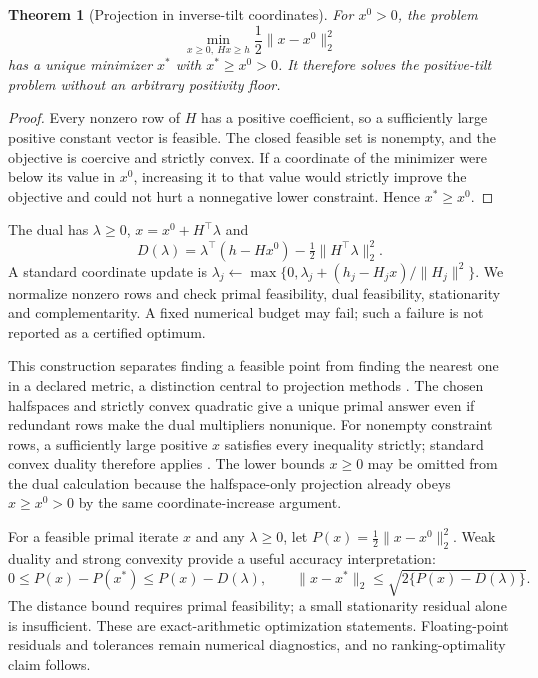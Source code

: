 \documentclass[pdflatex,sn-vancouver-num]{sn-jnl}
\theoremstyle{thmstyleone}
\newtheorem{theorem}{Theorem}
\begin{document}
\begin{theorem}[Projection in inverse-tilt coordinates]\label{thm:projection}
For $x^0>0$, the problem
\begin{equation}\label{eq:projection}
\min_{x\ge0,\ Hx\ge h}\frac12\|x-x^0\|_2^2
\end{equation}
has a unique minimizer $x^*$ with $x^*\ge x^0>0$. It therefore solves the positive-tilt problem without an arbitrary positivity floor.
\end{theorem}
\begin{proof}
Every nonzero row of $H$ has a positive coefficient, so a sufficiently large positive constant vector is feasible. The closed feasible set is nonempty, and the objective is coercive and strictly convex. If a coordinate of the minimizer were below its value in $x^0$, increasing it to that value would strictly improve the objective and could not hurt a nonnegative lower constraint. Hence $x^*\ge x^0$.
\end{proof}

The dual has $\lambda\ge0$, $x=x^0+H^\top\lambda$ and
\[
D(\lambda)=\lambda^\top(h-Hx^0)
-\tfrac12\|H^\top\lambda\|_2^2.
\]
A standard coordinate update is
$\lambda_j\leftarrow\max\{0,\lambda_j+(h_j-H_jx)/\|H_j\|^2\}$.
We normalize nonzero rows and check primal feasibility, dual feasibility, stationarity and complementarity. A fixed numerical budget may fail; such a failure is not reported as a certified optimum.

This construction separates finding a feasible point from finding the nearest one in a declared metric, a distinction central to projection methods \cite{projection,dykstra}. The chosen halfspaces and strictly convex quadratic give a unique primal answer even if redundant rows make the dual multipliers nonunique. For nonempty constraint rows, a sufficiently large positive $x$ satisfies every inequality strictly; standard convex duality therefore applies \cite{convex}. The lower bounds $x\ge0$ may be omitted from the dual calculation because the halfspace-only projection already obeys $x\ge x^0>0$ by the same coordinate-increase argument.

For a feasible primal iterate $x$ and any $\lambda\ge0$, let $P(x)=\tfrac12\|x-x^0\|_2^2$. Weak duality and strong convexity provide a useful accuracy interpretation:
\begin{equation}\label{eq:gap-bound}
0\le P(x)-P(x^*)\le P(x)-D(\lambda),\qquad
\|x-x^*\|_2\le\sqrt{2\{P(x)-D(\lambda)\}}.
\end{equation}
The distance bound requires primal feasibility; a small stationarity residual alone is insufficient. These are exact-arithmetic optimization statements. Floating-point residuals and tolerances remain numerical diagnostics, and no ranking-optimality claim follows.
\end{document}

